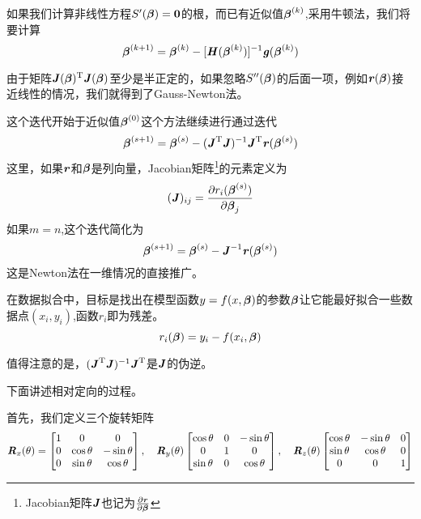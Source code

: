 如果我们计算非线性方程$S'(\Vbeta)=\Vzero$的根，而已有近似值$\Vbeta^{(k)}$,采用牛顿法，我们将要计算
\begin{equation}
\Vbeta^{(k+1)}=\Vbeta^{(k)}-[\MH(\Vbeta^{(k)})]^{-1}\Vg(\Vbeta^{(k)})
\end{equation}

由于矩阵$\MJ(\Vbeta)\myt\MJ(\Vbeta)$至少是半正定的，如果忽略$S''(\Vbeta)$的后面一项，例如$\Vr(\Vbeta)$接近线性的情况，我们就得到了Gauss-Newton法。

这个迭代开始于近似值$\Vbeta^{(0)}$这个方法继续进行通过迭代
\begin{equation}
\Vbeta^{(s+1)}=\Vbeta^{(s)}-(\MJ\myt\MJ)^{-1}\MJ\myt\Vr(\Vbeta^{(s)})
\end{equation}
这里，如果$\Vr$和$\Vbeta$是列向量，Jacobian矩阵\footnote{Jacobian矩阵$\MJ$也记为$\frac{\partial \Vr}{\partial \Vbeta}$}的元素定义为
\begin{equation}
(\MJ)_{ij}=\frac{\partial r_i(\Vbeta^{(s)})}{\partial\Vbeta_j}
\end{equation}
如果$m=n$,这个迭代简化为
\begin{equation}
\Vbeta^{(s+1)}=\Vbeta^{(s)}-\MJ^{-1}\Vr(\Vbeta^{(s)})
\end{equation}
这是Newton法在一维情况的直接推广。

在数据拟合中，目标是找出在模型函数$y=f(x,\Vbeta)$的参数$\Vbeta$让它能最好拟合一些数据点$(x_i,y_i)$,函数$r_i$即为残差。
\begin{equation}
r_i(\Vbeta)=y_i-f(x_i,\Vbeta)
\end{equation}

值得注意的是，$(\MJ\myt\MJ)^{-1}\MJ\myt$是$\MJ$的伪逆。

下面讲述相对定向的过程。

首先，我们定义三个旋转矩阵
\begin{equation}
\MR_x(\theta)=\begin{bmatrix}
1 & 0 & 0 \\
0 & \cos\theta & -\sin\theta \\
0 & \sin\theta & \cos\theta
\end{bmatrix},\quad \MR_y(\theta)
\begin{bmatrix}
\cos\theta & 0 & -\sin\theta \\
0 & 1 & 0 \\
\sin\theta & 0 & \cos\theta
\end{bmatrix},\quad \MR_z(\theta)
\begin{bmatrix}
\cos\theta & -\sin\theta & 0 \\
\sin\theta & \cos\theta & 0 \\
0 & 0 & 1
\end{bmatrix}
\label{eq:rotationmatrix}
\end{equation}

